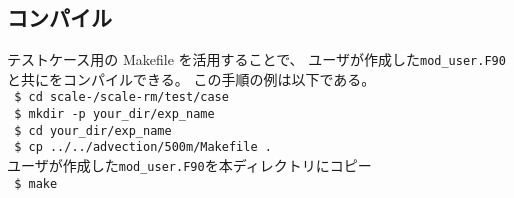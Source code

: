 \subsection{コンパイル}
テストケース用の Makefile を活用することで、
ユーザが作成した\verb|mod_user.F90|と共に{\scalerm}をコンパイルできる。
この手順の例は以下である。\\
\texttt{ \$ cd scale-\version/scale-rm/test/case}\\
\texttt{ \$ mkdir -p your\_dir/exp\_name}\\
\texttt{ \$ cd your\_dir/exp\_name}\\
\texttt{ \$ cp ../../advection/500m/Makefile .}\\
\noindent ユーザが作成した\verb|mod_user.F90|を本ディレクトリにコピー \\
\texttt{ \$ make}
